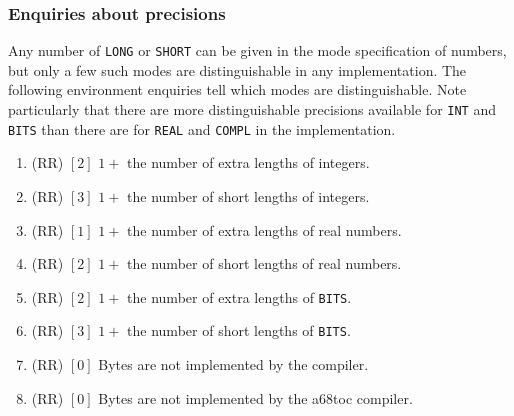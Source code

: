 \subsubsection*{Enquiries about precisions}
Any number of \verb|LONG| or \verb|SHORT| can be given in the mode
specification of numbers, but only a few such modes are distinguishable
in any implementation. The following environment enquiries tell which
modes are distinguishable. Note particularly that there are more
distinguishable precisions available for \verb|INT| and \verb|BITS|
than there are for \verb|REAL| and \verb|COMPL| in the
 implementation.
\begin{enumerate}
\item {} (RR) $[2]$ \newline
$1+$ the number of extra lengths of integers.
\item {} (RR) $[3]$ \newline
$1+$ the number of short lengths of integers.
\item {} (RR) $[1]$ \newline
$1+$ the number of extra lengths of real numbers.
\item {} (RR) $[2]$ \newline
$1+$ the number of short lengths of real numbers.
\item {} (RR) $[2]$ \newline
$1+$ the number of extra lengths of \verb|BITS|.
\item {} (RR) $[3]$ \newline
$1+$ the number of short lengths of \verb|BITS|.
\item {} (RR) $[0]$ \newline
Bytes are not implemented by the
 compiler.
\item {} (RR) $[0]$ \newline
Bytes are not implemented by the a68toc compiler.
\end{enumerate}


